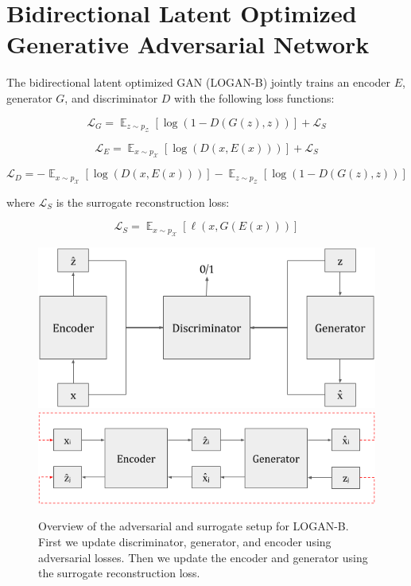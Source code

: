 \documentclass[10pt,twocolumn,letterpaper]{article}
\DeclareMathOperator*{\E}{\mathbb{E}}
\begin{document}
\section{Bidirectional Latent Optimized Generative Adversarial Network}

The bidirectional latent optimized GAN (LOGAN-B) jointly trains an encoder $E$, generator $G$, and discriminator $D$ with the following loss functions:

\begin{equation}
    \mathcal{L}_{G} = \E_{z \sim p_{\mathcal{Z}}}\left[\log(1 - D(G(z), z))\right] + \mathcal{L}_{S}
\end{equation}

\begin{equation}
    \mathcal{L}_{E} = \E_{x \sim p_{\mathcal{X}}}\left[\log(D(x, E(x)))\right] + \mathcal{L}_{S}
\end{equation}

\begin{equation}
    \mathcal{L}_{D} = - \E_{x \sim p_{\mathcal{X}}}\left[\log(D(x, E(x)))\right] - \E_{z \sim p_{\mathcal{Z}}}\left[\log(1 - D(G(z), z))\right]
\end{equation}

where $\mathcal{L}_{S}$ is the surrogate reconstruction loss:

\begin{equation}
    \mathcal{L}_{S} =  \E_{x\sim p_{\mathcal{X}}}\left[ \ell(x, G(E(x))) \right]
    \label{surrogate_loss}
\end{equation}

\begin{figure}
    \centering
    \includegraphics[width=\linewidth]{diagrams/bigan.png}
    \phantom{\;}
    \includegraphics[width=\linewidth]{diagrams/surrogate.png}
    \caption{Overview of the adversarial and surrogate setup for LOGAN-B. First we update discriminator, generator, and encoder using adversarial losses. Then we update the encoder and generator using the surrogate reconstruction loss.}
    \label{fig:overview_diagram}
\end{figure}
\end{document}
